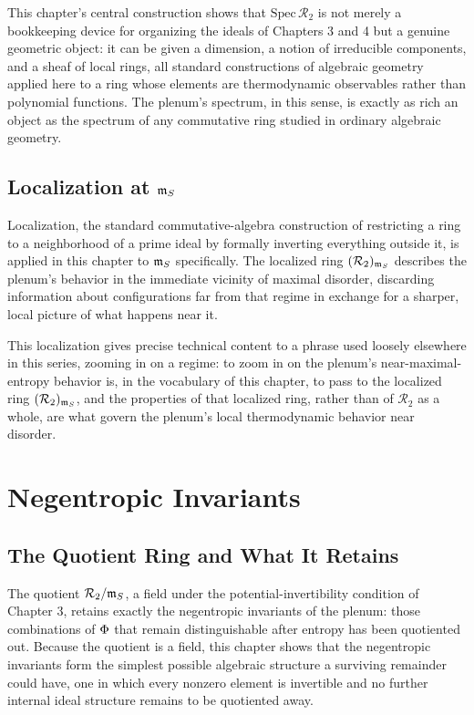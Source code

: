 This chapter's central construction shows that $\mathrm{Spec}\,\mathcal{R}_2$ is not merely a bookkeeping device for organizing the ideals of Chapters 3 and 4 but a genuine geometric object: it can be given a dimension, a notion of irreducible components, and a sheaf of local rings, all standard constructions of algebraic geometry applied here to a ring whose elements are thermodynamic observables rather than polynomial functions. The plenum's spectrum, in this sense, is exactly as rich an object as the spectrum of any commutative ring studied in ordinary algebraic geometry.

\chapter{Localization at $\mathfrak{m}_{S}$}

Localization, the standard commutative-algebra construction of restricting a ring to a neighborhood of a prime ideal by formally inverting everything outside it, is applied in this chapter to $\mathfrak{m}_{S}$ specifically. The localized ring $(\mathcal{R}_2)_{\mathfrak{m}_{S}}$ describes the plenum's behavior in the immediate vicinity of maximal disorder, discarding information about configurations far from that regime in exchange for a sharper, local picture of what happens near it.

This localization gives precise technical content to a phrase used loosely elsewhere in this series, zooming in on a regime: to zoom in on the plenum's near-maximal-entropy behavior is, in the vocabulary of this chapter, to pass to the localized ring $(\mathcal{R}_2)_{\mathfrak{m}_{S}}$, and the properties of that localized ring, rather than of $\mathcal{R}_2$ as a whole, are what govern the plenum's local thermodynamic behavior near disorder.

\part{Negentropic Invariants}

\chapter{The Quotient Ring and What It Retains}

The quotient $\mathcal{R}_2 / \mathfrak{m}_{S}$, a field under the potential-invertibility condition of Chapter 3, retains exactly the negentropic invariants of the plenum: those combinations of $\Phi$ that remain distinguishable after entropy has been quotiented out. Because the quotient is a field, this chapter shows that the negentropic invariants form the simplest possible algebraic structure a surviving remainder could have, one in which every nonzero element is invertible and no further internal ideal structure remains to be quotiented away.

